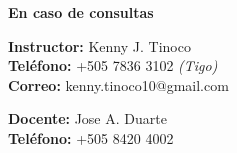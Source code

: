 \begin{flushright}
    \textbf{\large En caso de consultas}

    \textbf{Instructor:} Kenny J. Tinoco \\
    \textbf{Teléfono:} +505 7836 3102 \emph{(Tigo)} \\
    \textbf{Correo:} kenny.tinoco10@gmail.com

    \textbf{Docente:} Jose A. Duarte\\
    \textbf{Teléfono:} +505 8420 4002

\end{flushright}